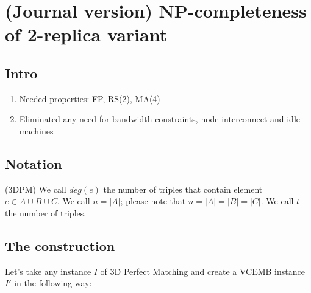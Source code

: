 \section{(Journal version) NP-completeness of 2-replica variant}

\subsection{Intro}

\begin{enumerate}
  \item Needed properties: FP, RS(2), MA(4)
  \item Eliminated any need for bandwidth constraints, node interconnect and idle machines
\end{enumerate}

\subsection{Notation}

(3DPM) We call $deg(e)$ the number of triples that contain element
$e\in A\cup B\cup C$. We call $n=|A|$; please note that
$n=|A|=|B|=|C|$. We call $t$ the number of triples.

\subsection{The construction}

Let's take any instance $I$ of 3D Perfect Matching and create a VCEMB
instance $I'$ in the following way:

